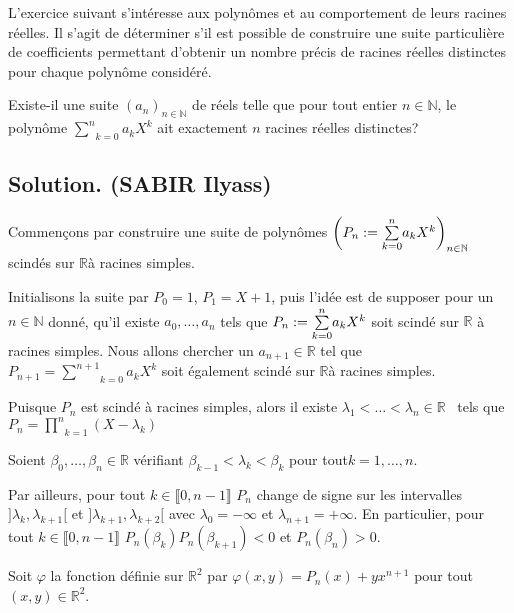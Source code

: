 L'exercice suivant s'int{\'e}resse aux polyn{\^o}mes et au comportement de
leurs racines r{\'e}elles. Il s'agit de d{\'e}terminer s'il est possible de
construire une suite particuli{\`e}re de coefficients permettant d'obtenir un
nombre pr{\'e}cis de racines r{\'e}elles distinctes pour chaque polyn{\^o}me
consid{\'e}r{\'e}.
\begin{exercise}
Existe-il une suite $(a_n)_{n \in \mathbb{N}}$ de r{\'e}els telle que pour
tout entier $n \in \mathbb{N}$, le polyn{\^o}me $\underset{k =
0}{\overset{n}{\sum}} a_k X^k$ ait exactement $n$ racines r{\'e}elles
distinctes?
\end{exercise}

\subsection*{Solution. (SABIR Ilyass)}

Commen{\c c}ons par construire une suite de polyn{\^o}mes $\left( P_n :=
\underset{k = 0}{\overset{n}{\sum}} a_k X^k \right)_{n \in \mathbb{N}}$
scind{\'e}s sur $\mathbb{R}${\`a} racines simples.

Initialisons la suite par $P_0 = 1$, $P_1 = X + 1$, puis l'id{\'e}e est de
supposer pour un $n \in \mathbb{N}$ donn{\'e}, qu'il existe $a_0, \ldots, a_n$
tels que $P_n := \underset{k = 0}{\overset{n}{\sum}} a_k X^k$ soit
scind{\'e} sur $\mathbb{R}$ {\`a} racines simples. Nous allons chercher un
$a_{n + 1} \in \mathbb{R}$ tel que $P_{n + 1} = \underset{k = 0}{\overset{n +
1}{\sum}} a_k X^k$ soit {\'e}galement scind{\'e} sur $\mathbb{R}${\`a} racines
simples.

Puisque $P_n$ est scind{\'e} {\`a} racines simples, alors il existe $\lambda_1
< \ldots < \lambda_n \in \mathbb{R}$ \ tels que $P_n = \underset{k =
1}{\overset{n}{\prod}} (X - \lambda_k)$

Soient $\beta_0, \ldots, \beta_n \in \mathbb{R}$ v{\'e}rifiant $\beta_{k - 1}
< \lambda_k < \beta_k$ pour tout$k = 1, \ldots, n$.

Par ailleurs, pour tout $k \in \llbracket 0, n - 1 \rrbracket$ $P_n$ change de
signe sur les intervalles $] \lambda_k, \lambda_{k + 1} [$ et  $] \lambda_{k +
1}, \lambda_{k + 2} [$ avec $\lambda_0 = - \infty$ et $\lambda_{n + 1} = +
\infty$. En particulier, pour tout $k \in \llbracket 0, n - 1 \rrbracket$ $P_n
(\beta_k) P_n (\beta_{k + 1}) < 0$ et $P_n (\beta_n) > 0$.

Soit $\varphi$ la fonction d{\'e}finie sur $\mathbb{R}^2$ par $\varphi (x, y)
= P_n (x) + y x^{n + 1}$ pour tout $(x, y) \in \mathbb{R}^2$.

